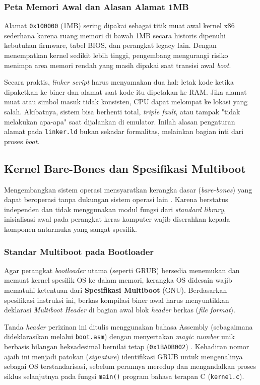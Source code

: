 \subsubsection{Peta Memori Awal dan Alasan Alamat 1MB}
Alamat \texttt{0x100000} (1MB) sering dipakai sebagai titik muat awal kernel x86 sederhana karena ruang memori di bawah 1MB secara historis dipenuhi kebutuhan firmware, tabel BIOS, dan perangkat legacy lain. Dengan menempatkan kernel sedikit lebih tinggi, pengembang mengurangi risiko menimpa area memori rendah yang masih dipakai saat transisi awal \textit{boot}.

Secara praktis, \textit{linker script} harus menyamakan dua hal: letak kode ketika dipaketkan ke biner dan alamat saat kode itu dipetakan ke RAM. Jika alamat muat atau simbol masuk tidak konsisten, CPU dapat melompat ke lokasi yang salah. Akibatnya, sistem bisa berhenti total, \textit{triple fault}, atau tampak "tidak melakukan apa-apa" saat dijalankan di emulator. Inilah alasan pengaturan alamat pada \texttt{linker.ld} bukan sekadar formalitas, melainkan bagian inti dari proses \textit{boot}.

\subsection{Kernel Bare-Bones dan Spesifikasi Multiboot}
Mengembangkan sistem operasi mensyaratkan kerangka dasar (\textit{bare-bones}) yang dapat beroperasi tanpa dukungan sistem operasi lain \cite{osdev_wiki_barebones}. Karena berstatus independen dan tidak menggunakan modul fungsi dari \textit{standard library}, inisialisasi awal pada perangkat keras komputer wajib diserahkan kepada komponen antarmuka yang sangat spesifik.

\subsubsection{Standar Multiboot pada Bootloader}
Agar perangkat \textit{bootloader} utama (seperti GRUB) bersedia menemukan dan memuat kernel spesifik OS ke dalam memori, kerangka OS didesain wajib mematuhi ketentuan dari \textbf{Spesifikasi Multiboot} (GNU). Berdasarkan spesifikasi instruksi ini, berkas kompilasi biner awal harus menyuntikkan deklarasi \textit{Multiboot Header} di bagian awal blok \textit{header} berkas (\textit{file format}).

Tanda \textit{header} perizinan ini ditulis menggunakan bahasa Assembly (sebagaimana dideklarasikan melalui \texttt{boot.asm}) dengan menyertakan \textit{magic number} unik berbasis bilangan heksadesimal bernilai tetap (\texttt{0x1BADB002}) \cite{gnu_multiboot}. Kehadiran nomor ajaib ini menjadi patokan (\textit{signature}) identifikasi GRUB untuk mengenalinya sebagai OS terstandarisasi, sebelum perannya meredup dan mengandalkan proses siklus selanjutnya pada fungsi \texttt{main()} program bahasa terapan C (\texttt{kernel.c}).

